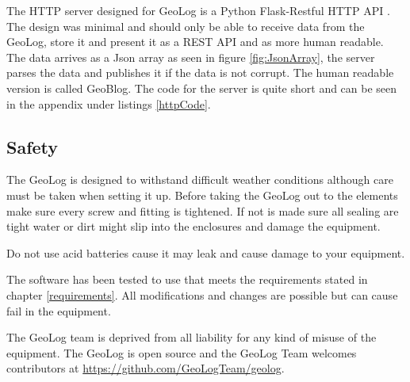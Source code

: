 The HTTP server designed for GeoLog is a Python Flask-Restful HTTP API
\cite{flask-restful}. The design was minimal and should only be able to
receive data from the GeoLog, store it and present it as a REST API and as more human
readable. The data arrives as a Json array as seen in figure \ref{fig:JsonArray}, the server parses the data and publishes it if the data is not corrupt. The human readable version is called GeoBlog. The code for the server is quite short and can be seen in the appendix under listings \ref{httpCode}.

\subsection{Safety}
The GeoLog is designed to withstand difficult weather conditions although care must be taken when setting it up. Before taking the GeoLog out to the elements make sure
every screw and fitting is tightened. If not is made sure all sealing are tight
water or dirt might slip into the enclosures and damage the equipment.

Do not use acid batteries cause it may leak and cause damage to your equipment.

The software has been tested to use that meets the requirements stated in chapter 
\ref{requirements}. All modifications and changes are possible but can cause fail
in the equipment.

The GeoLog team is deprived from all liability for any kind of misuse of the 
equipment. The GeoLog is open source and the GeoLog Team welcomes contributors
at \url{https://github.com/GeoLogTeam/geolog}.



